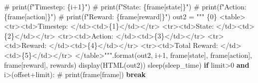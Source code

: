 \documentclass[
  letterpaper,
]{scrbook}
\newenvironment{Shaded}{\begin{snugshade}}{\end{snugshade}}
\newcommand{\BuiltInTok}[1]{\textcolor[rgb]{0.00,0.23,0.31}{#1}}
\newcommand{\CommentTok}[1]{\textcolor[rgb]{0.37,0.37,0.37}{#1}}
\newcommand{\ControlFlowTok}[1]{\textcolor[rgb]{0.00,0.23,0.31}{\textbf{#1}}}
\newcommand{\DecValTok}[1]{\textcolor[rgb]{0.68,0.00,0.00}{#1}}
\newcommand{\KeywordTok}[1]{\textcolor[rgb]{0.00,0.23,0.31}{\textbf{#1}}}
\newcommand{\NormalTok}[1]{\textcolor[rgb]{0.00,0.23,0.31}{#1}}
\newcommand{\OperatorTok}[1]{\textcolor[rgb]{0.37,0.37,0.37}{#1}}
\newcommand{\SpecialCharTok}[1]{\textcolor[rgb]{0.37,0.37,0.37}{#1}}
\newcommand{\StringTok}[1]{\textcolor[rgb]{0.13,0.47,0.30}{#1}}
\begin{document}
\begin{Shaded}
\begin{Highlighting}[]
    \CommentTok{\#         print(f"Timestep: \{i+1\}")}
    \CommentTok{\#         print(f"State: \{frame[\textquotesingle{}state\textquotesingle{}]\}")}
    \CommentTok{\#         print(f"Action: \{frame[\textquotesingle{}action\textquotesingle{}]\}")}
    \CommentTok{\#         print(f"Reward: \{frame[\textquotesingle{}reward\textquotesingle{}]\}")}
\NormalTok{            out2 }\OperatorTok{=} \StringTok{"""}
\StringTok{            }\SpecialCharTok{\{0\}}
\StringTok{            \textless{}table\textgreater{}}
\StringTok{                \textless{}tr\textgreater{}\textless{}td\textgreater{}Timestep: \textless{}/td\textgreater{}\textless{}td\textgreater{}}\SpecialCharTok{\{1\}}\StringTok{\textless{}/td\textgreater{}\textless{}/tr\textgreater{}}
\StringTok{                \textless{}tr\textgreater{}\textless{}td\textgreater{}State: \textless{}/td\textgreater{}\textless{}td\textgreater{}}\SpecialCharTok{\{2\}}\StringTok{\textless{}/td\textgreater{}\textless{}/tr\textgreater{}}
\StringTok{                \textless{}tr\textgreater{}\textless{}td\textgreater{}Action: \textless{}/td\textgreater{}\textless{}td\textgreater{}}\SpecialCharTok{\{3\}}\StringTok{\textless{}/td\textgreater{}\textless{}/tr\textgreater{}}
\StringTok{                \textless{}tr\textgreater{}\textless{}td\textgreater{}Reward: \textless{}/td\textgreater{}\textless{}td\textgreater{}}\SpecialCharTok{\{4\}}\StringTok{\textless{}/td\textgreater{}\textless{}/tr\textgreater{}}
\StringTok{                \textless{}tr\textgreater{}\textless{}td\textgreater{}Total Reward: \textless{}/td\textgreater{}\textless{}td\textgreater{}}\SpecialCharTok{\{5\}}\StringTok{\textless{}/td\textgreater{}\textless{}/tr\textgreater{}}
\StringTok{            \textless{}/table\textgreater{}"""}\NormalTok{.}\BuiltInTok{format}\NormalTok{(out2, i}\OperatorTok{+}\DecValTok{1}\NormalTok{, frame[}\StringTok{\textquotesingle{}state\textquotesingle{}}\NormalTok{], frame[}\StringTok{\textquotesingle{}action\textquotesingle{}}\NormalTok{], frame[}\StringTok{\textquotesingle{}reward\textquotesingle{}}\NormalTok{], rewards)}
\NormalTok{            display(HTML(out2))}
\NormalTok{            sleep(sleep\_time)}
            \ControlFlowTok{if}\NormalTok{ limit}\OperatorTok{\textgreater{}}\DecValTok{0} \KeywordTok{and}\NormalTok{ i}\OperatorTok{\textgreater{}}\NormalTok{(offset}\OperatorTok{+}\NormalTok{limit): }
                \CommentTok{\# print(frame[\textquotesingle{}frame\textquotesingle{}])}
                \ControlFlowTok{break}


\end{Highlighting}
\end{Shaded}
\end{document}
